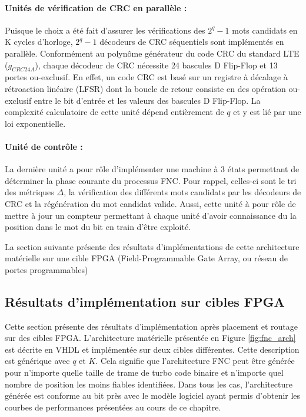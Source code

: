 \paragraph*{Unités de vérification de CRC en parallèle :} Puisque le choix a été fait d'assurer les vérifications 
des $2^q - 1$ mots candidats en K cycles d'horloge, $2^q - 1$ décodeurs de CRC séquentiels sont implémentés en parallèle.
Conformément au polynôme générateur du code CRC du standard LTE ($g_{CRC24A}$), chaque décodeur de CRC nécessite 24 
bascules D Flip-Flop et 13 portes ou-exclusif. En effet, un code CRC est basé sur un registre à décalage à rétroaction linéaire (LFSR) dont la boucle de retour consiste en des opération ou-exclusif entre le bit d'entrée et les valeurs des 
bascules D Flip-Flop. La complexité calculatoire de cette unité dépend entièrement de $q$ et y est lié par une loi exponentielle.
\paragraph*{Unité de contrôle :} La dernière unité a pour rôle d'implémenter une machine à 3 états permettant de 
déterminer la phase courante du processus FNC. Pour rappel, celles-ci sont le tri des métriques $\Delta$, la 
vérification des différents mots candidats par les décodeurs de CRC et la régénération du mot candidat valide. Aussi, 
cette unité à pour rôle de mettre à jour un compteur permettant à chaque unité d'avoir connaissance du la position dans 
le mot du bit  en train d'être exploité.

La section suivante présente des résultats d'implémentations de cette architecture matérielle sur une cible FPGA (Field-Programmable Gate Array, ou réseau de portes programmables)

\subsection{Résultats d'implémentation sur cibles FPGA}
Cette section présente des résultats d'implémentation après placement et routage sur des cibles FPGA. L'architecture 
matérielle  présentée en Figure \ref{fig:fnc_arch} est décrite en VHDL et implémentée sur deux cibles différentes. 
Cette description est générique avec $q$ et $K$. Cela signifie que l'architecture FNC peut être générée pour n'importe 
quelle taille de trame de turbo code binaire et n'importe quel nombre de position les moins fiables identifiées. Dans
tous les cas, 
l'architecture générée est conforme au bit près avec le modèle logiciel ayant permis d'obtenir les courbes de 
performances présentées au cours de ce chapitre.

